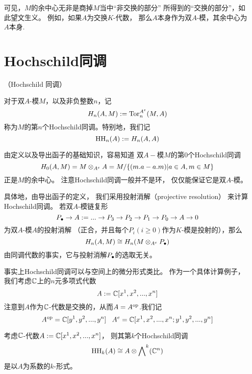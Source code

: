 可见，$M$的余中心无非是商掉$M$当中“非交换的部分”
所得到的“交换的部分”，如此望文生义。
例如，如果$A$为交换$K$-代数，
那么$A$本身作为双$A$-模，其余中心为$A$本身.

\section{Hochschild同调}

\begin{definition}（Hochschild 同调）

对于双$A$-模$M$，以及非负整数$n$，记
$$H_n(A,M):=\operatorname{Tor}_n^{A^e}(M,A)$$
称为$M$的第$n$个Hochschild同调。特别地，我们记
$$\operatorname{HH}_n(A):=H_n(A,A)$$
\end{definition}

由定义以及导出函子的基础知识，容易知道
双$A-$模$M$的第$0$个Hochschild同调
$$H_0(A,M)=M\otimes_{A^e}A=M/\{(m.a-a.m)|a\in A,m\in M\}$$
正是$M$的余中心。
注意Hochschild同调一般并不是环，
仅仅能保证它是双$A$-模。


具体地，由导出函子的定义，
我们采用投射消解（projective resolution）
来计算Hochschild同调。
若双$A$-模链复形
$$P_{\bullet}\to A:=
...\to P_3\to P_2\to P_1\to P_0\to A\to 0$$
为双$A$-模$A$的投射消解
（正合，并且每个$P_i(i\geq 0)$作为$K$-模是投射的），那么
$$H_n(A,M)\cong H_n(M\otimes_{A^e}P_{\bullet})$$
由同调代数的事实，它与投射消解$P_{\bullet}$的选取无关。\vs

事实上Hochschild同调可以与空间上的微分形式类比。
作为一个具体计算例子，我们考虑$\mathbb{C}$上的$n$元多项式代数
$$A:=\mathbb{C}[x^1,x^2,...,x^n]$$
注意到$A$作为$\mathbb{C}$-代数是交换的，从而$A=A^{\text{op}}$.我们记
$$A^{\text{op}}=\mathbb{C}[y^1,y^2,...,y^n]\,\,\,\,\,
A^e=\mathbb{C}[x^1,x^2,...,x^n;y^1,y^2,...,y^n]$$

\begin{prop}
\label{C[x^i]的HH同调}
考虑$\mathbb{C}$-代数$A:=\mathbb{C}[x^1,x^2,...,x^n]$，
则其第$k$个Hochschild同调
$$\operatorname{HH}_k(A)\cong A\otimes\bigwedge\nolimits^ k(\mathbb{C}^n)$$
是以$A$为系数的$k$-形式。
\end{prop}

